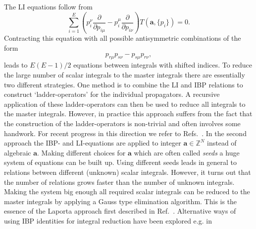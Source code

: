 \documentclass[a4paper,12pt]{scrartcl}
\newcommand*{\bm}{\boldsymbol}
\newcommand{\del}{\partial}                     %
\begin{document}
The LI equations follow from
\begin{equation}
  \sum\limits_{i=1}^{E}\left(p^{\nu}_{i}\frac{\del}{\del
      p_{i\mu}}-p_{i}^{\mu}\frac{\del}{\del
      p_{i\nu}}\right)T(\bm{a},\{p_{i}\})=0.
\label{eq:lorentz}
\end{equation}
Contracting this equation with all possible antisymmetric combinations
of the form
\begin{equation}
  p_{r\mu}p_{s\nu}-p_{s\mu}p_{r\nu},
\end{equation}
leads to $E(E-1)/2$ equations between integrals with shifted indices.
To reduce the large number of scalar integrals to the master integrals
there are essentially two different strategies. One method is to
combine the LI and IBP relations to construct `ladder-operators' for
the individual propagators. A recursive application of these 
ladder-operators can then be used to reduce all integrals to the master
integrals. However, in practice this approach suffers from the fact
that the construction of the ladder-operators is non-trivial and
often involves some handwork. For recent progress in this direction we
refer to Refs.~\cite{Smirnov:2013dia,Lee:2013mka,Ruijl:2017cxj}. In the second
approach the IBP- and LI-equations are applied to integer $\bm{a}\in
\mathbb{Z}^N$ instead of algebraic $\bm{a}$. Making different choices
for $\bm{a}$ which are often called \textit{seeds} a huge system of
equations can be built up.  Using different seeds leads in general to
relations between different (unknown) scalar integrals. However, it
turns out that the number of relations grows faster than the number
of unknown integrals. Making the system big
enough all required scalar integrals can be reduced to the master
integrals by applying a Gauss type elimination algorithm. This is the
essence of the Laporta approach first described in Ref.~\cite{Laporta:2001dd}.
Alternative ways of using IBP identities for integral reduction have been 
explored e.g. in \cite{Ita:2015tya,Larsen:2015ped}
\end{document}
